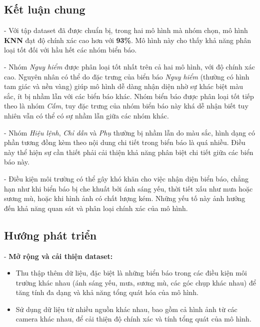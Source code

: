 \documentclass[a4paper,12pt]{article}
\begin{document}
\subsection*{Kết luận chung}

\hspace{6mm}- Với tập dataset đã được chuẩn bị, trong hai mô hình mà nhóm chọn, mô hình \textbf{KNN} đạt độ chính xác cao hơn với \textbf{93\%}. Mô hình này cho thấy khả năng phân loại tốt đối với hầu hết các nhóm biển báo. 

- Nhóm \textit{Nguy hiểm} được phân loại tốt nhất trên cả hai mô hình, với độ chính xác cao. Nguyên nhân có thể do đặc trưng của biển báo \textit{Nguy hiểm} (thường có hình tam giác và nền vàng) giúp mô hình dễ dàng nhận diện nhờ sự khác biệt màu sắc, ít bị nhầm lẫn với các biển báo khác. Nhóm biển báo được phân loại tốt tiếp theo là nhóm \textit{Cấm}, tuy đặc trưng của nhóm biển báo này khá dễ nhận biết tuy nhiên vẫn có thể có sự nhầm lẫn giữa các nhóm khác.
  
- Nhóm \textit{Hiệu lệnh}, \textit{Chỉ dẫn} và \textit{Phụ} thường bị nhầm lẫn do màu sắc, hình dạng có phần tương đồng kèm theo nội dung chi tiết trong biển báo là quá nhiều. Điều này thể hiện sự cần thiết phải cải thiện khả năng phân biệt chi tiết giữa các biển báo này.

- Điều kiện môi trường có thể gây khó khăn cho việc nhận diện biển báo, chẳng hạn như khi biển báo bị che khuất bởi ánh sáng yếu, thời tiết xấu như mưa hoặc sương mù, hoặc khi hình ảnh có chất lượng kém. Những yếu tố này ảnh hưởng đến khả năng quan sát và phân loại chính xác của mô hình.

\subsection*{Hướng phát triển}

\hspace{6mm}- \textbf{Mở rộng và cải thiện dataset:}
    \begin{itemize}
        \item Thu thập thêm dữ liệu, đặc biệt là những biển báo trong các điều kiện môi trường khác nhau (ánh sáng yếu, mưa, sương mù, các góc chụp khác nhau) để tăng tính đa dạng và khả năng tổng quát hóa của mô hình.
        \item Sử dụng dữ liệu từ nhiều nguồn khác nhau, bao gồm cả hình ảnh từ các camera khác nhau, để cải thiện độ chính xác và tính tổng quát của mô hình.
    \end{itemize}
\end{document}
